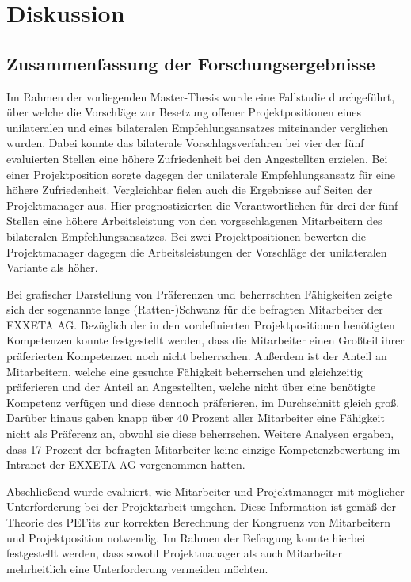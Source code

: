 \chapter{Diskussion}
\label{ch:diskussion}

\section{Zusammenfassung der Forschungsergebnisse}
\label{ch:diskussion:zusammenfassung}
Im Rahmen der vorliegenden Master-Thesis wurde eine Fallstudie durchgeführt, über welche die Vorschläge zur Besetzung offener Projektpositionen eines unilateralen und eines bilateralen Empfehlungsansatzes miteinander verglichen wurden. Dabei konnte das bilaterale Vorschlagsverfahren bei vier der fünf evaluierten Stellen eine höhere Zufriedenheit bei den Angestellten erzielen. Bei einer Projektposition sorgte dagegen der unilaterale Empfehlungsansatz für eine höhere Zufriedenheit. Vergleichbar fielen auch die Ergebnisse auf Seiten der Projektmanager aus. Hier prognostizierten die Verantwortlichen für drei der fünf Stellen eine höhere Arbeitsleistung von den vorgeschlagenen Mitarbeitern des bilateralen Empfehlungsansatzes. Bei zwei Projektpositionen bewerten die Projektmanager dagegen die Arbeitsleistungen der Vorschläge der unilateralen Variante als höher.

Bei grafischer Darstellung von Präferenzen und beherrschten Fähigkeiten zeigte sich der sogenannte lange (Ratten-)Schwanz für die befragten Mitarbeiter der EXXETA AG. Bezüglich der in den vordefinierten Projektpositionen benötigten Kompetenzen konnte festgestellt werden, dass die Mitarbeiter einen Großteil ihrer präferierten Kompetenzen noch nicht beherrschen. Außerdem ist der Anteil an Mitarbeitern, welche eine gesuchte Fähigkeit beherrschen und gleichzeitig präferieren und der Anteil an Angestellten, welche nicht über eine benötigte Kompetenz verfügen und diese dennoch präferieren, im Durchschnitt gleich groß. Darüber hinaus gaben knapp über 40 Prozent aller Mitarbeiter eine Fähigkeit nicht als Präferenz an, obwohl sie diese beherrschen. Weitere Analysen ergaben, dass 17 Prozent der befragten Mitarbeiter keine einzige Kompetenzbewertung im Intranet der EXXETA AG vorgenommen hatten.

Abschließend wurde evaluiert, wie Mitarbeiter und Projektmanager mit möglicher Unterforderung bei der Projektarbeit umgehen. Diese Information ist gemäß der Theorie des \acp{PEFit} zur korrekten Berechnung der Kongruenz von Mitarbeitern und Projektposition notwendig. Im Rahmen der Befragung konnte hierbei festgestellt werden, dass sowohl Projektmanager als auch Mitarbeiter mehrheitlich eine Unterforderung vermeiden möchten.

